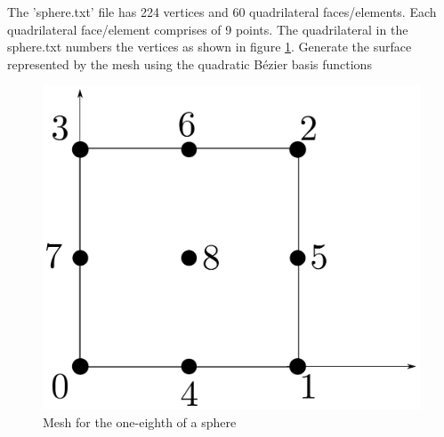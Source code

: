 \documentclass[a4paper, 11pt]{article}
\begin{document}
\begin{enumerate}
The 'sphere.txt' file has 224 vertices and 60 quadrilateral faces/elements. Each quadrilateral face/element comprises of 9 points. The quadrilateral in the sphere.txt numbers the vertices as shown in figure \ref{fig:sphereNodeNumber}. Generate the surface represented by the mesh  using the quadratic B\'{e}zier basis functions
\begin{figure}
\includegraphics[scale=0.35]{resources/quadraticSquareElement.pdf} 
\centering
\caption{Mesh for the one-eighth of a sphere}
\label{fig:sphereNodeNumber} 
\end{figure}

\end{enumerate}
\end{document}
